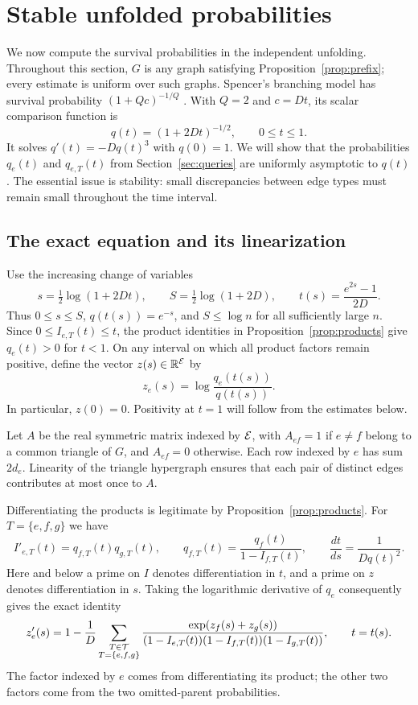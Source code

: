 \section{Stable unfolded probabilities}\label{sec:stability}

We now compute the survival probabilities in the independent unfolding.
Throughout this section, $G$ is any graph satisfying
Proposition~\ref{prop:prefix}; every estimate is uniform over such graphs.
Spencer's branching model has survival probability $(1+Qc)^{-1/Q}$
\cite[Section~3, equation~(9)]{Spencer1995}. With $Q=2$ and $c=Dt$, its
scalar comparison function is
\begin{equation}\label{eq:scalar-survival}
 q(t)=(1+2Dt)^{-1/2},\qquad 0\le t\le1.
\end{equation}
It solves $q'(t)=-Dq(t)^3$ with $q(0)=1$.  We will show that the
probabilities $q_e(t)$ and $q_{e,T}(t)$ from Section~\ref{sec:queries}
are uniformly asymptotic to $q(t)$.  The essential issue is stability:
small discrepancies between edge types must remain small throughout
the time interval.

\subsection{The exact equation and its linearization}

Use the increasing change of variables
\[
 s=\tfrac12\log(1+2Dt),\qquad
 S=\tfrac12\log(1+2D),\qquad
 t(s)=\frac{e^{2s}-1}{2D}.
\]
Thus $0\le s\le S$, $q(t(s))=e^{-s}$, and $S\le\log n$ for
all sufficiently large $n$.  Since $0\le I_{e,T}(t)\le t$, the product
identities in Proposition~\ref{prop:products} give $q_e(t)>0$ for
$t<1$.  On any interval on which all product factors remain positive,
define the vector $z(s)\in\mathbb R^{\mathcal E}$ by
\[
 z_e(s)=\log\frac{q_e(t(s))}{q(t(s))}.
\]
In particular, $z(0)=0$.  Positivity at $t=1$ will follow from the
estimates below.

Let $A$ be the real symmetric matrix indexed by $\mathcal E$, with
$A_{ef}=1$ if $e\ne f$ belong to a common triangle of $G$, and
$A_{ef}=0$ otherwise.  Each row indexed by $e$ has sum $2d_e$.
Linearity of the triangle hypergraph ensures that each pair of distinct
edges contributes at most once to $A$.

Differentiating the products is legitimate by
Proposition~\ref{prop:products}.  For $T=\{e,f,g\}$ we have
\[
 I'_{e,T}(t)=q_{f,T}(t)q_{g,T}(t),\qquad
 q_{f,T}(t)=\frac{q_f(t)}{1-I_{f,T}(t)},\qquad
 \frac{dt}{ds}=\frac1{Dq(t)^2}.
\]
Here and below a prime on $I$ denotes differentiation in $t$, and a
prime on $z$ denotes differentiation in $s$.  Taking the logarithmic
derivative of $q_e$ consequently gives the exact identity
\begin{equation}\label{eq:exact-z}
 z'_e(s)=1-\frac1D
 \sum_{\substack{T\in\mathcal T\\T=\{e,f,g\}}}
 \frac{\exp(z_f(s)+z_g(s))}
 {(1-I_{e,T}(t))(1-I_{f,T}(t))(1-I_{g,T}(t))},
 \qquad t=t(s).
\end{equation}
The factor indexed by $e$ comes from differentiating its product;
the other two factors come from the two omitted-parent probabilities.


